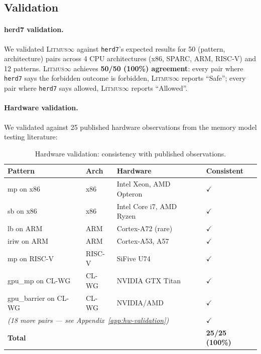 \documentclass[10pt]{article}
\newcommand{\litmus}{\textsc{Litmus$\infty$}}
\newcommand{\cmark}{$\checkmark$}
\begin{document}
\subsection{Validation}
\label{sec:validation}

\paragraph{herd7 validation.}
We validated \litmus{} against \texttt{herd7}'s expected results for
50 (pattern, architecture) pairs across 4 CPU architectures (x86,
SPARC, ARM, RISC-V) and 12 patterns. \litmus{} achieves \textbf{50/50
(100\%) agreement}: every pair where \texttt{herd7} says the forbidden
outcome is forbidden, \litmus{} reports ``Safe''; every pair where
\texttt{herd7} says allowed, \litmus{} reports ``Allowed''.

\paragraph{Hardware validation.}
We validated against 25 published hardware observations from the
memory model testing literature:

\begin{table}[h]
\centering
\caption{Hardware validation: consistency with published observations.}
\label{tab:hw-validation}
\small
\begin{tabular}{llll}
\toprule
\textbf{Pattern} & \textbf{Arch} & \textbf{Hardware} & \textbf{Consistent} \\
\midrule
mp on x86 & x86 & Intel Xeon, AMD Opteron~\cite{OwensSarkarSewell2009} & \cmark \\
sb on x86 & x86 & Intel Core i7, AMD Ryzen~\cite{OwensSarkarSewell2009} & \cmark \\
lb on ARM & ARM & Cortex-A72 (rare)~\cite{Alglave2014} & \cmark \\
iriw on ARM & ARM & Cortex-A53, A57~\cite{Alglave2014} & \cmark \\
mp on RISC-V & RISC-V & SiFive U74~\cite{RISCV2019} & \cmark \\
gpu\_mp on CL-WG & CL-WG & NVIDIA GTX Titan~\cite{Sorensen2016} & \cmark \\
gpu\_barrier on CL-WG & CL-WG & NVIDIA/AMD~\cite{Sorensen2016} & \cmark \\
\multicolumn{3}{l}{\textit{(18 more pairs --- see Appendix~\ref{app:hw-validation})}} & \cmark \\
\midrule
\multicolumn{3}{l}{\textbf{Total}} & \textbf{25/25 (100\%)} \\
\bottomrule
\end{tabular}
\end{table}
\end{document}
